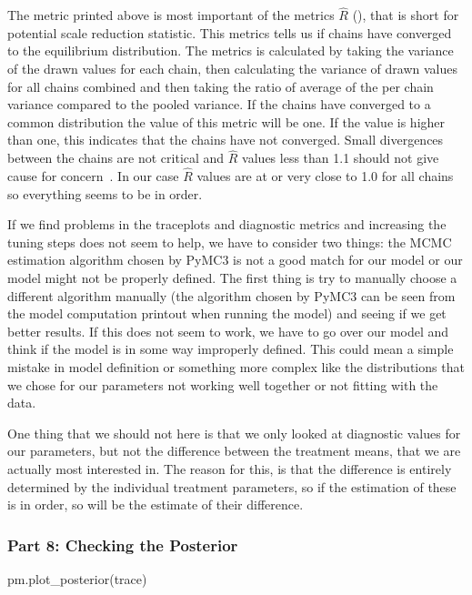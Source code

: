\documentclass[12pt,a4paper,leqno]{report}
\theoremstyle{plain}
\theoremstyle{definition}
\theoremstyle{remark}
\begin{document}

The metric printed above is most important of the metrics \(\hat{R}\) (), that is short for potential scale
reduction statistic. This metrics tells us if
chains have converged to the equilibrium distribution. The metrics is calculated by
taking the variance of the drawn values for each chain,
then calculating the variance of drawn values for all chains combined and then taking the
ratio of average of the per chain variance compared to the pooled variance. If the
chains have converged to a common distribution the value of this metric will be one. If
the value is higher than one, this indicates that the chains have not converged. Small
divergences between the chains are not critical and \(\hat{R}\) values less than 1.1 should
not give cause for concern\ \cite{rhatrule}. In our case \(\hat{R}\) values are at or
very close to 1.0 for
all chains so everything seems to be in order.

If we find problems in the traceplots and diagnostic metrics and increasing the tuning
steps does not seem to help, we have to consider two things: the
MCMC estimation algorithm chosen by PyMC3 is not a good match for our model or our model might not
be properly defined. The first thing is try to manually choose a different algorithm
manually (the algorithm chosen by PyMC3 can be seen from the model computation printout
when running the model) and seeing
if we get better results. If this does not seem to work, we have to go over our model and
think if the model is in some way improperly defined. This could mean a simple mistake
in model definition or something more complex like the distributions that we chose for
our parameters not working well together or not fitting with the data.

One thing that we should not here is that we only looked at diagnostic values for our
parameters, but not the difference between the treatment means, that we are actually
most interested in. The reason for this, is that the difference is entirely determined
by the individual treatment parameters, so if the estimation of these is in order, so
will be the estimate of their difference.

\subsubsection*{Part 8: Checking the Posterior}

\bigskip
\begin{pyverbatim}[][fontsize=\footnotesize]
    pm.plot_posterior(trace)
\end{pyverbatim}
\smallskip
\end{document}
